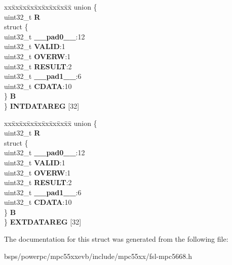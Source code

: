 \begin{DoxyCompactItemize}
\begin{tabbing}
\end{tabbing}\item 
\mbox{\label{structADC__tag_a410b594078c43571c4c7e6e1f7fce9db}} 
\begin{tabbing}
xx\=xx\=xx\=xx\=xx\=xx\=xx\=xx\=xx\=\kill
union \{\\
\>uint32\_t {\bfseries R}\\
\>struct \{\\
\>\>uint32\_t {\bfseries \_\_pad0\_\_}:12\\
\>\>uint32\_t {\bfseries VALID}:1\\
\>\>uint32\_t {\bfseries OVERW}:1\\
\>\>uint32\_t {\bfseries RESULT}:2\\
\>\>uint32\_t {\bfseries \_\_pad1\_\_}:6\\
\>\>uint32\_t {\bfseries CDATA}:10\\
\>\} {\bfseries B}\\
\} {\bfseries INTDATAREG} \mbox{[}32\mbox{]}\\

\end{tabbing}\item 
\mbox{\label{structADC__tag_a351a38bdf76c086a4593fdbef982d8a6}} 
\begin{tabbing}
xx\=xx\=xx\=xx\=xx\=xx\=xx\=xx\=xx\=\kill
union \{\\
\>uint32\_t {\bfseries R}\\
\>struct \{\\
\>\>uint32\_t {\bfseries \_\_pad0\_\_}:12\\
\>\>uint32\_t {\bfseries VALID}:1\\
\>\>uint32\_t {\bfseries OVERW}:1\\
\>\>uint32\_t {\bfseries RESULT}:2\\
\>\>uint32\_t {\bfseries \_\_pad1\_\_}:6\\
\>\>uint32\_t {\bfseries CDATA}:10\\
\>\} {\bfseries B}\\
\} {\bfseries EXTDATAREG} \mbox{[}32\mbox{]}\\

\end{tabbing}\end{DoxyCompactItemize}


The documentation for this struct was generated from the following file\+:\begin{DoxyCompactItemize}
\item 
bsps/powerpc/mpc55xxevb/include/mpc55xx/fsl-\/mpc5668.\+h\end{DoxyCompactItemize}
